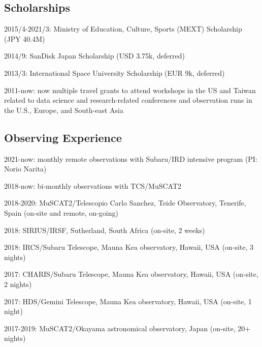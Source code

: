 \documentclass[12pt,letterpaper]{article}
\begin{document}
\fi

\subsection{Scholarships}
\begin{list}{}{\cvlist}
  \item 2015/4-2021/3: Ministry of Education, Culture, Sports (MEXT) Scholarship (JPY 40.4M)
  \item 2014/9: SanDisk Japan Scholarship (USD 3.75k, deferred)
  \item 2013/3: International Space University Scholarship (EUR 9k, deferred)
  \item 2011-now: now multiple travel grants to attend workshops in the US and Taiwan related to data science and research-related conferences and observation runs in the U.S., Europe, and South-east Asia
\end{list}

\subsection{Observing Experience}
\begin{list}{}{\cvlist}
  \item 2021-now: monthly remote observations with Subaru/IRD intensive program (PI: Norio Narita) 
  \item 2018-now: bi-monthly observations with TCS/MuSCAT2
  \item 2018-2020: MuSCAT2/Telescopio Carlo Sanchez, Teide Observatory, Tenerife, Spain (on-site and remote, on-going)
  \item 2018: SIRIUS/IRSF, Sutherland, South Africa (on-site, 2 weeks)
  \item 2018: IRCS/Subaru Telescope, Mauna Kea observatory, Hawaii, USA (on-site, 3 nights)
  \item 2017: CHARIS/Subaru Telescope, Mauna Kea observatory, Hawaii, USA (on-site, 2 nights)
  \item 2017: HDS/Gemini Telescope, Mauna Kea observatory, Hawaii, USA (on-site, 1 night)
  \item 2017-2019: MuSCAT2/Okayama astronomical observatory, Japan (on-site, 20+ nights)
\end{list}
\end{document}
